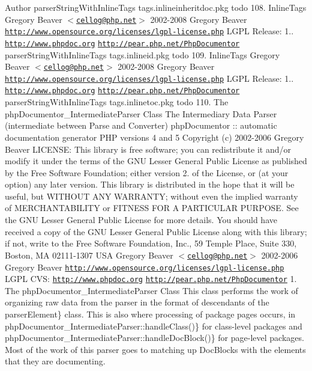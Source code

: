\begin{DoxyAuthor}{\-Author}
parser\-String\-With\-Inline\-Tags  tags.\-inlineinheritdoc.\-pkg  todo 108.   \-Inline\-Tags  \-Gregory \-Beaver $<$\href{mailto:cellog@php.net}{\tt cellog@php.\-net}$>$  2002-\/2008 \-Gregory \-Beaver  \href{http://www.opensource.org/licenses/lgpl-license.php}{\tt http\-://www.\-opensource.\-org/licenses/lgpl-\/license.\-php} \-L\-G\-P\-L  \-Release\-: 1..   \href{http://www.phpdoc.org}{\tt http\-://www.\-phpdoc.\-org}  \href{http://pear.php.net/PhpDocumentor}{\tt http\-://pear.\-php.\-net/\-Php\-Documentor}  parser\-String\-With\-Inline\-Tags  tags.\-inlineid.\-pkg  todo 109.   \-Inline\-Tags  \-Gregory \-Beaver $<$\href{mailto:cellog@php.net}{\tt cellog@php.\-net}$>$  2002-\/2008 \-Gregory \-Beaver  \href{http://www.opensource.org/licenses/lgpl-license.php}{\tt http\-://www.\-opensource.\-org/licenses/lgpl-\/license.\-php} \-L\-G\-P\-L  \-Release\-: 1..   \href{http://www.phpdoc.org}{\tt http\-://www.\-phpdoc.\-org}  \href{http://pear.php.net/PhpDocumentor}{\tt http\-://pear.\-php.\-net/\-Php\-Documentor}  parser\-String\-With\-Inline\-Tags  tags.\-inlinetoc.\-pkg  todo 110.  \-The php\-Documentor\-\_\-\-Intermediate\-Parser \-Class  \-The \-Intermediary \-Data \-Parser (intermediate between \-Parse and \-Converter)  php\-Documentor \-:\-: automatic documentation generator  \-P\-H\-P versions 4 and 5  \-Copyright (c) 2002-\/2006 \-Gregory \-Beaver  \-L\-I\-C\-E\-N\-S\-E\-:  \-This library is free software; you can redistribute it and/or modify it under the terms of the \-G\-N\-U \-Lesser \-General \-Public \-License as published by the \-Free \-Software \-Foundation; either version 2. of the \-License, or (at your option) any later version.  \-This library is distributed in the hope that it will be useful, but \-W\-I\-T\-H\-O\-U\-T \-A\-N\-Y \-W\-A\-R\-R\-A\-N\-T\-Y; without even the implied warranty of \-M\-E\-R\-C\-H\-A\-N\-T\-A\-B\-I\-L\-I\-T\-Y or \-F\-I\-T\-N\-E\-S\-S \-F\-O\-R \-A \-P\-A\-R\-T\-I\-C\-U\-L\-A\-R \-P\-U\-R\-P\-O\-S\-E. \-See the \-G\-N\-U \-Lesser \-General \-Public \-License for more details.  \-You should have received a copy of the \-G\-N\-U \-Lesser \-General \-Public \-License along with this library; if not, write to the \-Free \-Software \-Foundation, \-Inc., 59 \-Temple \-Place, \-Suite 330, \-Boston, \-M\-A 02111-\/1307 \-U\-S\-A   \-Gregory \-Beaver $<$\href{mailto:cellog@php.net}{\tt cellog@php.\-net}$>$  2002-\/2006 \-Gregory \-Beaver  \href{http://www.opensource.org/licenses/lgpl-license.php}{\tt http\-://www.\-opensource.\-org/licenses/lgpl-\/license.\-php} \-L\-G\-P\-L  \-C\-V\-S\-:    \href{http://www.phpdoc.org}{\tt http\-://www.\-phpdoc.\-org}  \href{http://pear.php.net/PhpDocumentor}{\tt http\-://pear.\-php.\-net/\-Php\-Documentor}  1.  \-The php\-Documentor\-\_\-\-Intermediate\-Parser \-Class  \-This class performs the work of organizing raw data from the parser in the format of descendants of the  parser\-Element\} class. \-This is also where processing of package pages occurs, in  php\-Documentor\-\_\-\-Intermediate\-Parser\-::handle\-Class()\} for class-\/level packages and  php\-Documentor\-\_\-\-Intermediate\-Parser\-::handle\-Doc\-Block()\} for page-\/level packages.  \-Most of the work of this parser goes to matching up \-Doc\-Blocks with the elements that they are documenting. 
\end{DoxyAuthor}
